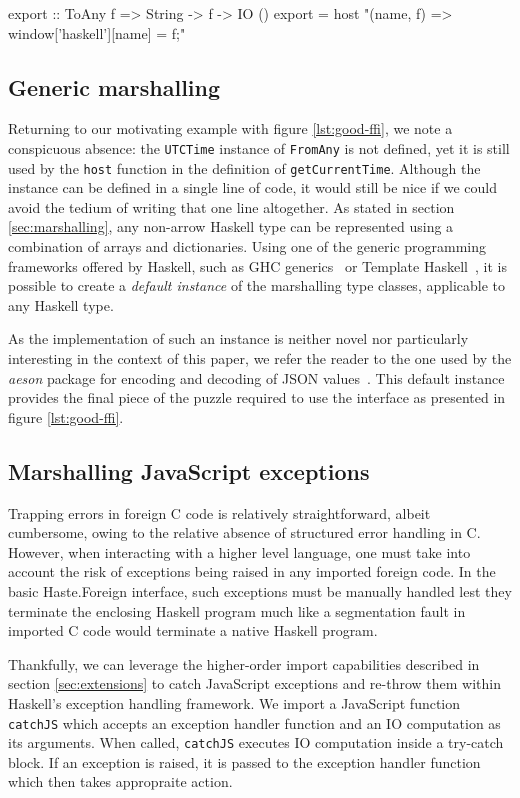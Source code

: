 \documentclass[preprint]{sigplanconf}
\begin{document}
\begin{code}
export :: ToAny f => String -> f -> IO ()
export =
  host "(name, f) => window['haskell'][name] = f;"
\end{code}

\subsection{Generic marshalling}
\label{sec:default-instances}
Returning to our motivating example with figure \ref{lst:good-ffi}, we note
a conspicuous absence: the \lstinline!UTCTime! instance of \lstinline!FromAny!
is not defined, yet it is still used by the \lstinline!host! function in the
definition of \lstinline!getCurrentTime!. Although the instance can be defined
in a single line of code, it would still be nice if we could avoid the tedium
of writing that one line altogether. As stated in section
\ref{sec:marshalling}, any non-arrow Haskell type can be represented using
a combination of arrays and dictionaries. Using one of the generic programming
frameworks offered by Haskell, such as GHC generics\ \cite{generics} or
Template Haskell\ \cite{th}, it is possible to create a \emph{default instance}
of the marshalling type classes, applicable to any Haskell type.

As the implementation of such an instance is neither novel nor particularly
interesting in the context of this paper, we refer the reader to the one
used by the \emph{aeson} package for encoding and decoding of
JSON values\ \cite{aeson}. This default instance provides the final piece
of the puzzle required to use the interface as presented in
figure \ref{lst:good-ffi}.


\subsection{Marshalling JavaScript exceptions}
\label{sec:marshalling-exceptions}
Trapping errors in foreign C code is relatively straightforward, albeit
cumbersome, owing to the relative absence of structured error handling in C.
However, when interacting with a higher level language, one must take into
account the risk of exceptions being raised in any imported foreign code.
In the basic Haste.Foreign interface, such exceptions must be manually handled
lest they terminate the enclosing Haskell program much like a segmentation
fault in imported C code would terminate a native Haskell program.

Thankfully, we can leverage the higher-order import capabilities described
in section \ref{sec:extensions} to catch JavaScript exceptions and re-throw
them within Haskell's exception handling framework.
We import a JavaScript function \lstinline!catchJS! which accepts an
exception handler function and an IO computation as its arguments.
When called, \lstinline!catchJS! executes IO computation inside a try-catch
block. If an exception is raised, it is passed to the exception handler
function which then takes appropraite action.
\end{document}
